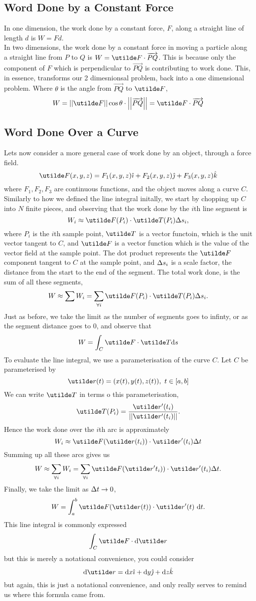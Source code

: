 \documentclass{report}
\begin{document}
\subsection*{Word Done by a Constant Force}
In one dimension, the work done by a constant force, $F$, along a straight line of length $d$ is $W = Fd$. \\

In two dimensions, the work done by a constant force in moving a particle along a straight line from $P$ to $Q$ is $W = \ut{F}\cd\overrightarrow{PQ}$. This is because only the component of $F$ which is perpendicular to $\overrightarrow{PQ}$ is contributing to work done. This, in essence, transforms our 2 dimesnionsal problem, back into a one dimensional problem. Where $\theta$ is the angle from $\overrightarrow{PQ}$ to $\ut{F}$,
$$
	W = \Mag{\ut{F}}\cos\theta \cd \Mag{\overrightarrow{PQ}} = \ut{F}\cd\overrightarrow{PQ}
$$

\subsection*{Word Done Over a Curve}
Lets now consider a more general case of work done by an object, through a force field.
$$
	\ut{F}(x,y,z) = F_1(x,y,z)\ihat + F_2(x,y,z)\jhat + F_3(x,y,z)\khat
$$
where $F_1,F_2,F_3$ are continuous functions, and the object moves along a curve $C$. \\

Similarly to how we defined the line integral initally, we start by chopping up $C$ into $N$ finite pieces, and observing that the work done by the $i$th line segment is 
$$
	W_i \approx \ut{F}(P_i) \cd \ut{T}(P_i) \D s_i,
$$
where $P_i$ is the $i$th sample point, $\ut{T}$ is a vector functoin, which is the unit vector tangent to $C$, and $\ut{F}$ is a vector function which is the value of the vector field at the sample point. The dot product represents the $\ut{F}$ component tangent to $C$ at the sample point, and $\Delta s_i$ is a scale factor, the distance from the start to the end of the segment. The total work done, is the sum of all these segments,
$$
	W \approx \sum W_i = \sum_{\forall i} \ut{F}(P_i)\cd\ut{T}(P_i) \D s_i.
$$
Just as before, we take the limit as the number of segments goes to infinty, or as the segment distance goes to 0, and observe that
$$
	W = \int_C \ut{F}\cd\ut{T}\d s
$$
To evaluate the line integral, we use a parameterisation of the curve $C$. Let $C$ be parameterised by
$$
	\ut{r}(t) = (x(t), y(t), z(t)),\ t\in[a,b]
$$
We can write $\ut{T}$ in terms o this parameterisation, 
$$
	\ut{T}(P_i) = \frac{\ut{r}'(t_i)}{\Mag{\ut{r}'(t_i)}}.
$$
Hence the work done over the $i$th arc is approximately
$$
	W_i \approx \ut{F}(\ut{r}(t_i))\cd\ut{r}'(t_i)\D t
$$
Summing up all these arcs gives us
$$
	W \approx \sum_{\forall i} W_i = \sum_{\forall i} \ut{F}(\ut{r}'t_i))\cd\ut{r}'(t_i)\D t.
$$
Finally, we take the limit as $\Delta t\to 0$,
$$
	W = \int_a^b \ut{F}(\ut{r}(t))\cd\ut{r}'(t)\ \d t.
$$
This line integral is commonly expressed
$$
	\int_C \ut{F}\cd\d\ut{r}
$$
but this is merely a notational convenience, you could consider 
$$
	\d\ut{r} = \d x\ihat + \d y\jhat + \d z\khat
$$
but again, this is just a notational convenience, and only really serves to remind us where this formula came from.
\end{document}
